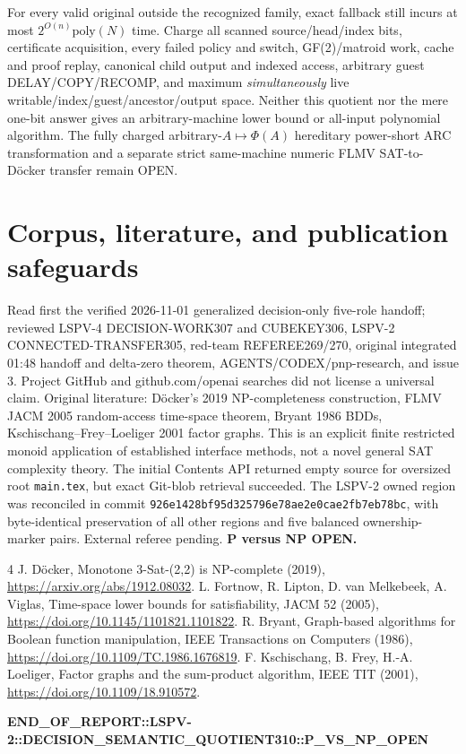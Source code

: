 \documentclass[11pt]{article}
\begin{document}
For every valid original outside the recognized family, exact fallback still incurs at most $2^{O(n)}\mathrm{poly}(N)$ time. Charge all scanned source/head/index bits, certificate acquisition, every failed policy and switch, GF(2)/matroid work, cache and proof replay, canonical child output and indexed access, arbitrary guest DELAY/COPY/RECOMP, and maximum \emph{simultaneously} live writable/index/guest/ancestor/output space. Neither this quotient nor the mere one-bit answer gives an arbitrary-machine lower bound or all-input polynomial algorithm. The fully charged arbitrary-$A\mapsto\Phi(A)$ hereditary power-short ARC transformation and a separate strict same-machine numeric FLMV SAT-to-D\"ocker transfer remain OPEN.

\section{Corpus, literature, and publication safeguards}
Read first the verified 2026-11-01 generalized decision-only five-role handoff; reviewed LSPV-4 DECISION-WORK307 and CUBEKEY306, LSPV-2 CONNECTED-TRANSFER305, red-team REFEREE269/270, original integrated 01:48 handoff and delta-zero theorem, AGENTS/CODEX/pnp-research, and issue 3. Project GitHub and github.com/openai searches did not license a universal claim. Original literature: D\"ocker's 2019 NP-completeness construction, FLMV JACM 2005 random-access time-space theorem, Bryant 1986 BDDs, Kschischang--Frey--Loeliger 2001 factor graphs. This is an explicit finite restricted monoid application of established interface methods, not a novel general SAT complexity theory. The initial Contents API returned empty source for oversized root \texttt{main.tex}, but exact Git-blob retrieval succeeded. The LSPV-2 owned region was reconciled in commit \texttt{926e1428bf95d325796e78ae2e0cae2fb7eb78bc}, with byte-identical preservation of all other regions and five balanced ownership-marker pairs. External referee pending. \textbf{P versus NP OPEN.}
\begin{thebibliography}{4}
 J. D\"ocker, Monotone 3-Sat-(2,2) is NP-complete (2019), \url{https://arxiv.org/abs/1912.08032}.
 L. Fortnow, R. Lipton, D. van Melkebeek, A. Viglas, Time-space lower bounds for satisfiability, JACM 52 (2005), \url{https://doi.org/10.1145/1101821.1101822}.
 R. Bryant, Graph-based algorithms for Boolean function manipulation, IEEE Transactions on Computers (1986), \url{https://doi.org/10.1109/TC.1986.1676819}.
 F. Kschischang, B. Frey, H.-A. Loeliger, Factor graphs and the sum-product algorithm, IEEE TIT (2001), \url{https://doi.org/10.1109/18.910572}.
\end{thebibliography}
\noindent\textbf{END\_OF\_REPORT::LSPV-2::DECISION\_SEMANTIC\_QUOTIENT310::P\_VS\_NP\_OPEN}
\end{document}
